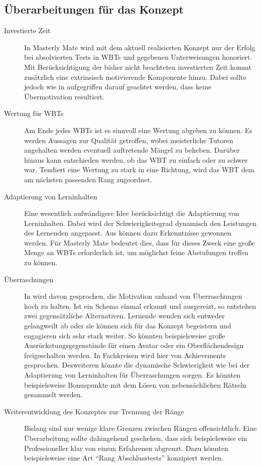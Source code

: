 \subsection{Überarbeitungen für das Konzept}
\begin{description}
\item[Investierte Zeit] In Masterly Mate wird mit dem aktuell
realisierten Konzept nur der Erfolg bei absolvierten Tests in WBTs
und gegebenen Unterweisungen honoriert. Mit Berücksichtigung der bisher nicht
beachteten investierten Zeit kommt zusätzlich eine extrinsisch motivierende
Komponente hinzu. Dabei sollte jedoch wie in \cite{korte:2009} aufgegriffen
darauf geachtet werden, dass keine Übermotivation resultiert.
\item[Wertung für WBTs] Am Ende jedes WBTs ist es sinnvoll eine Wertung abgeben
zu können. Es werden Aussagen zur Qualität getroffen, wobei meisterliche
Tutoren angehalten werden eventuell auftretende Mängel zu beheben. Darüber
hinaus kann entschieden werden, ob das WBT zu einfach oder zu schwer war.
Tendiert eine Wertung zu stark in eine Richtung, wird das WBT dem am nächsten passenden Rang zugeordnet.
\item[Adaptierung von Lerninhalten] Eine wesentlich aufwändigere Idee
berücksichtigt die Adaptierung von Lerninhalten. Dabei wird der
Schwierigkeitsgrad dynamisch den Leistungen des Lernenden angepasst. Aus
\cite{knall:2005} können dazu Erkenntnisse gewonnen werden. Für Masterly Mate
bedeutet dies, dass für dieses Zweck eine große Menge an WBTs erforderlich ist,
um möglichst feine Abstufungen treffen zu können.
\item[Überraschungen] In \cite{korte:2009} wird davon gesprochen, die
Motivation anhand von Überraschungen hoch zu halten. Ist ein Schema einmal
erkannt und ausgereizt, so entstehen zwei gegensätzliche Alternativen.
Lernende wenden sich entweder gelangweilt ab oder sie können sich für das
Konzept begeistern und engagieren sich sehr stark weiter. So könnten
beispielsweise große Ausrückstungsgegenstände für einen Avatar oder ein
Oberflächendesign freigeschalten werden. In Fachkreisen wird hier von
Achievements gesprochen. Desweiteren könnte die dynamische Schwierigkeit wie bei
der Adaptierung von Lerninhalten für Überraschungen sorgen. Es könnten
beispielsweise Bonuspunkte mit dem Lösen von nebensächlichen Rätseln
gesammelt werden.
\item[Weiterentwicklung des Konzeptes zur Trennung der Ränge] Bislang sind nur
wenige klare Grenzen zwischen Rängen offensichtlich. Eine Überarbeitung sollte
dahingehend geschehen, dass sich beispielsweise ein Professioneller klar von
einem Erfahrenen abgrenzt. Dazu könnten beispielsweise eine Art "`Rang
Abschlusstests"' konzipiert werden.
\end{description}


